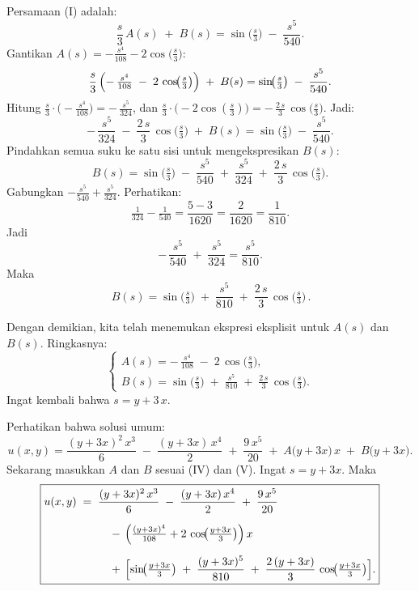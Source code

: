 \documentclass[a4paper]{article}
\theoremstyle{definition}
\begin{document}
\begin{enumerate}
\begin{enumerate}
      Persamaan (I) adalah:
      \[
      \frac{s}{3}\,A(s) \;+\; B(s)
      = \sin\!\bigl(\tfrac{s}{3}\bigr) \;-\; \frac{s^{5}}{540}.
      \]
      Gantikan \(A(s) = -\tfrac{s^{4}}{108} - 2\cos\bigl(\tfrac{s}{3}\bigr)\):
      \[
      \frac{s}{3}\,\Bigl(-\,\tfrac{s^{4}}{108} \;-\; 2\,\cos\!\bigl(\tfrac{s}{3}\bigr)\Bigr) \;+\; B(s)
      = \sin\!\bigl(\tfrac{s}{3}\bigr) \;-\; \frac{s^{5}}{540}.
      \]
      Hitung \(\displaystyle \frac{s}{3}\cdot\bigl(-\tfrac{s^{4}}{108}\bigr) = -\,\frac{s^{5}}{324}\), dan \(\displaystyle \frac{s}{3}\cdot\bigl(-2\cos(\tfrac{s}{3})\bigr) = -\,\tfrac{2\,s}{3}\,\cos\!\bigl(\tfrac{s}{3}\bigr)\). Jadi:
      \[
      -\,\frac{s^{5}}{324} 
      \;-\; \frac{2\,s}{3}\,\cos\!\bigl(\tfrac{s}{3}\bigr)
      \;+\; B(s)
      = \sin\!\bigl(\tfrac{s}{3}\bigr)
        \;-\; \frac{s^{5}}{540}.
      \]
      Pindahkan semua suku ke satu sisi untuk mengekspresikan \(B(s)\):
      \[
      B(s) 
      = \sin\!\bigl(\tfrac{s}{3}\bigr)
        \;-\; \frac{s^{5}}{540}
        \;+\; \frac{s^{5}}{324}
        \;+\; \frac{2\,s}{3}\,\cos\!\bigl(\tfrac{s}{3}\bigr).
      \]
      Gabungkan \(\displaystyle -\tfrac{s^{5}}{540} + \tfrac{s^{5}}{324}\). Perhatikan:
      \[
      \tfrac{1}{324} - \tfrac{1}{540}
      = \frac{5 - 3}{1620} 
      = \frac{2}{1620} 
      = \frac{1}{810}.
      \]
      Jadi
      \[
      -\,\frac{s^{5}}{540} \;+\; \frac{s^{5}}{324}
      = \frac{s^{5}}{810}.
      \]
      Maka
      \[
      \boxed{\,B(s) 
      = \sin\!\bigl(\tfrac{s}{3}\bigr)
        \;+\; \frac{s^{5}}{810}
        \;+\; \frac{2\,s}{3}\,\cos\!\bigl(\tfrac{s}{3}\bigr)\,.}
      \tag{V}
      \]

   Dengan demikian, kita telah menemukan ekspresi eksplisit untuk \(A(s)\) dan \(B(s)\). Ringkasnya:
   \[
   \begin{cases}
   A(s) = -\,\frac{s^{4}}{108} \;-\; 2\,\cos\!\bigl(\tfrac{s}{3}\bigr),\\
   B(s) = \sin\!\bigl(\tfrac{s}{3}\bigr)
        \;+\; \frac{s^{5}}{810}
        \;+\; \frac{2\,s}{3}\,\cos\!\bigl(\tfrac{s}{3}\bigr).
   \end{cases}
   \]
   Ingat kembali bahwa \(s = y + 3\,x\).  

   Perhatikan bahwa solusi umum:
   \[
   u(x,y)
   = \frac{(y + 3x)^{2}\,x^{3}}{6}
     \;-\; \frac{(y + 3x)\,x^{4}}{2}
     \;+\; \frac{9\,x^{5}}{20}
     \;+\; A\bigl(y+3x\bigr)\,x
     \;+\; B\bigl(y+3x\bigr).
   \]
   Sekarang masukkan \(A\) dan \(B\) sesuai (IV) dan (V). Ingat \(s = y+3x\). Maka
   \[
   \boxed{
   \begin{aligned}
   u(x,y) \;=\; {}& \frac{(y + 3x)^{2}\,x^{3}}{6}
     \;-\; \frac{(y + 3x)\,x^{4}}{2}
     \;+\; \frac{9\,x^{5}}{20}
     \\[6pt]
   &\quad -\,\Bigl(\tfrac{(y+3x)^{4}}{108} + 2\,\cos\!\bigl(\tfrac{y+3x}{3}\bigr)\Bigr)\,x
     \\[6pt]
   &\quad +\,\Bigl[
     \sin\!\bigl(\tfrac{y+3x}{3}\bigr)
     \;+\; \frac{(y+3x)^{5}}{810}
     \;+\; \frac{2\,(y+3x)}{3}\,\cos\!\bigl(\tfrac{y+3x}{3}\bigr)
     \Bigr].
   \end{aligned}
   }
   \]
  \end{enumerate}





\end{enumerate}
\end{document}
